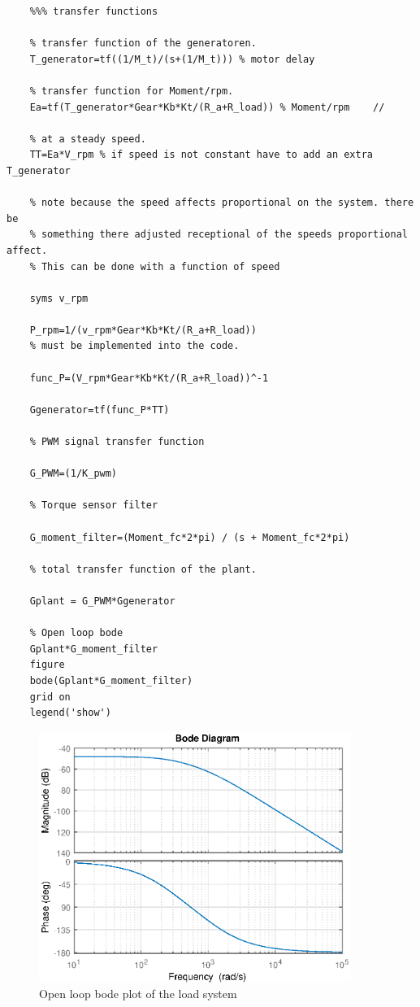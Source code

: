 \begin{lstlisting}
	%%% transfer functions
	
	% transfer function of the generatoren.
	T_generator=tf((1/M_t)/(s+(1/M_t))) % motor delay
	
	% transfer function for Moment/rpm.
	Ea=tf(T_generator*Gear*Kb*Kt/(R_a+R_load)) % Moment/rpm    //
	
	% at a steady speed.
	TT=Ea*V_rpm % if speed is not constant have to add an extra T_generator
	
	% note because the speed affects proportional on the system. there be
	% something there adjusted receptional of the speeds proportional affect.
	% This can be done with a function of speed
	
	syms v_rpm
	
	P_rpm=1/(v_rpm*Gear*Kb*Kt/(R_a+R_load))
	% must be implemented into the code.
	
	func_P=(V_rpm*Gear*Kb*Kt/(R_a+R_load))^-1
	
	Ggenerator=tf(func_P*TT)
	
	% PWM signal transfer function 
	
	G_PWM=(1/K_pwm)
	
	% Torque sensor filter
	
	G_moment_filter=(Moment_fc*2*pi) / (s + Moment_fc*2*pi)
	
	% total transfer function of the plant.
	
	Gplant = G_PWM*Ggenerator
	
	% Open loop bode
	Gplant*G_moment_filter
	figure
	bode(Gplant*G_moment_filter)
	grid on
	legend('show')
\end{lstlisting} 

\begin{figure}[H]
	\centering
	\includegraphics [width=4in]{Hardware/Pictures/RolingRoad_01.eps}
	\caption{Open loop bode plot of the load system}
	\label{fig:Open_loop_bode_load_system}
\end{figure}

